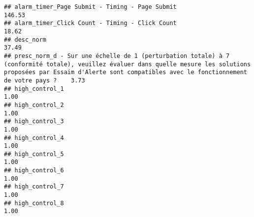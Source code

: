 \documentclass[
]{article}
\begin{document}
\begin{verbatim}
## alarm_timer_Page Submit - Timing - Page Submit                                                                                                                                                                              146.53
## alarm_timer_Click Count - Timing - Click Count                                                                                                                                                                               18.62
## desc_norm                                                                                                                                                                                                                    37.49
## presc_norm_d - Sur une échelle de 1 (perturbation totale) à 7 (conformité totale), veuillez évaluer dans quelle mesure les solutions proposées par Essaim d'Alerte sont compatibles avec le fonctionnement de votre pays ?    3.73
## high_control_1                                                                                                                                                                                                                1.00
## high_control_2                                                                                                                                                                                                                1.00
## high_control_3                                                                                                                                                                                                                1.00
## high_control_4                                                                                                                                                                                                                1.00
## high_control_5                                                                                                                                                                                                                1.00
## high_control_6                                                                                                                                                                                                                1.00
## high_control_7                                                                                                                                                                                                                1.00
## high_control_8                                                                                                                                                                                                                1.00

\end{verbatim}
\end{document}
